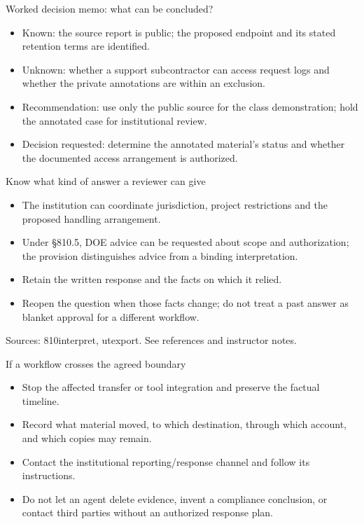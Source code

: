 \documentclass[aspectratio=169,11pt]{beamer}
\begin{document}
\begin{frame}[t,fragile]{Worked decision memo: what can be concluded?}
\fontsize{11.5}{14}\selectfont
\begin{itemize}\setlength{\itemsep}{2mm}
\item Known: the source report is public; the proposed endpoint and its stated retention terms are identified.
\item Unknown: whether a support subcontractor can access request logs and whether the private annotations are within an exclusion.
\item Recommendation: use only the public source for the class demonstration; hold the annotated case for institutional review.
\item Decision requested: determine the annotated material's status and whether the documented access arrangement is authorized.
\end{itemize}
\end{frame}
\begin{frame}[t,fragile]{Know what kind of answer a reviewer can give}
\fontsize{11.5}{14}\selectfont
\begin{itemize}\setlength{\itemsep}{2mm}
\item The institution can coordinate jurisdiction, project restrictions and the proposed handling arrangement.
\item Under \S{}810.5, DOE advice can be requested about scope and authorization; the provision distinguishes advice from a binding interpretation.
\item Retain the written response and the facts on which it relied.
\item Reopen the question when those facts change; do not treat a past answer as blanket approval for a different workflow.
\end{itemize}
\vfill{\fontsize{6.5}{8}\selectfont\color{UTgray} Sources: 810interpret, utexport. See references and instructor notes.\par}
\end{frame}
\begin{frame}[t,fragile]{If a workflow crosses the agreed boundary}
\fontsize{11.5}{14}\selectfont
\begin{itemize}\setlength{\itemsep}{2mm}
\item Stop the affected transfer or tool integration and preserve the factual timeline.
\item Record what material moved, to which destination, through which account, and which copies may remain.
\item Contact the institutional reporting/response channel and follow its instructions.
\item Do not let an agent delete evidence, invent a compliance conclusion, or contact third parties without an authorized response plan.
\end{itemize}
\end{frame}
\end{document}
